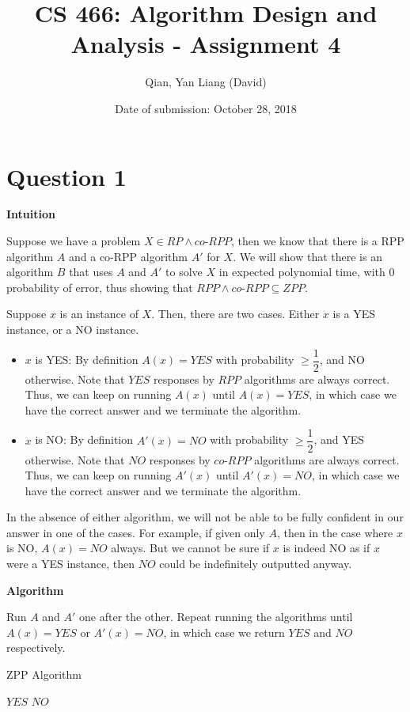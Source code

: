 \documentclass{article}
\title{CS 466: Algorithm Design and Analysis - Assignment 4}
\author{Qian, Yan Liang (David)}
\date{Date of submission: October 28, 2018}
\begin{document}
\newpage

\section{Question 1}


\textbf{Intuition}

Suppose we have a problem $X \in RP \land co$-$RPP$, then we know that there is a RPP algorithm $A$ and a co-RPP algorithm $A'$
for $X$. We will show that there is an algorithm $B$ that uses $A$ and $A'$ to solve $X$ in expected polynomial time,
with 0 probability of error, thus showing that $RPP \land co$-$RPP \subseteq ZPP$.

Suppose $x$ is an instance of $X$. Then, there are two cases. Either $x$ is a YES instance, or a NO instance.

\begin{itemize}
    \item $x$ is YES: By definition $A(x) = YES$ with probability $\geq \dfrac{1}{2}$, and NO otherwise. Note that $YES$
        responses by $RPP$ algorithms are always correct. Thus, we can keep on running $A(x)$ until $A(x) = YES$, in
        which case we have the correct answer and we terminate the algorithm.
    \item $x$ is NO: By definition $A'(x) = NO$ with probability $\geq \dfrac{1}{2}$, and YES otherwise. Note that $NO$
        responses by $co$-$RPP$ algorithms are always correct. Thus, we can keep on running $A'(x)$ until $A'(x) = NO$, in
        which case we have the correct answer and we terminate the algorithm.
\end{itemize}

In the absence of either algorithm, we will not be able to be fully confident in our answer in one of the cases. For
example, if given only $A$, then in the case where $x$ is NO, $A(x) = NO$ always. But we cannot be sure if $x$ is indeed
NO as if $x$ were a YES instance, then $NO$ could be indefinitely outputted anyway.

\textbf{Algorithm}

Run $A$ and $A'$ one after the other. Repeat running the algorithms until $A(x) = YES$ or $A'(x) = NO$, in which case we
return $YES$ and $NO$ respectively.

\begin{algorithm}
    \caption{ZPP Algorithm}\label{euclid}
    \begin{algorithmic}[1]
                \State \Return $YES$
            \EndIf
                \State \Return $NO$
            \EndIf
    \end{algorithmic}
\end{algorithm}
\end{document}
